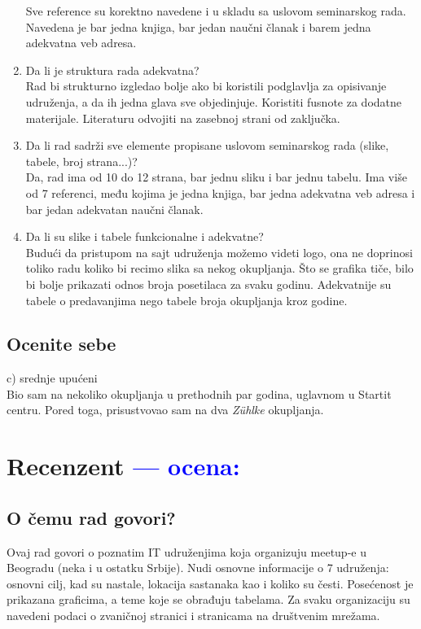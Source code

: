 \documentclass[a4paper]{report}
\newcommand{\odgovor}[1]{\textcolor{blue}{#1}}
\begin{document}
\begin{enumerate}
Sve reference su korektno navedene i u skladu sa uslovom seminarskog rada.
Navedena je bar jedna knjiga, bar jedan naučni članak i barem jedna adekvatna veb adresa.
\item Da li je struktura rada adekvatna?\\
Rad bi strukturno izgledao bolje ako bi koristili podglavlja za opisivanje udruženja,
a da ih jedna glava sve objedinjuje. Koristiti fusnote za dodatne materijale.
Literaturu odvojiti na zasebnoj strani od zaključka.
\item Da li rad sadrži sve elemente propisane uslovom seminarskog rada (slike, tabele, broj strana...)?\\
Da, rad ima od 10 do 12 strana, bar jednu sliku i bar jednu tabelu. Ima više od 7 referenci,
među kojima je jedna knjiga, bar jedna adekvatna veb adresa i bar jedan adekvatan naučni članak.
\item Da li su slike i tabele funkcionalne i adekvatne?\\
Budući da pristupom na sajt udruženja možemo videti logo, ona ne doprinosi toliko radu koliko bi recimo
slika sa nekog okupljanja. Što se grafika tiče, bilo bi bolje prikazati odnos broja posetilaca za svaku 
godinu. Adekvatnije su tabele o predavanjima nego tabele broja okupljanja kroz godine.
\end{enumerate}

\section{Ocenite sebe}
c) srednje upućeni\\
Bio sam na nekoliko okupljanja u prethodnih par godina, uglavnom
u Startit centru. Pored toga, prisustvovao sam na dva \textit{Zühlke} okupljanja. 


\chapter{Recenzent \odgovor{--- ocena:} }


\section{O čemu rad govori?}
Ovaj rad govori o poznatim IT udruženjima koja organizuju meetup-e u Beogradu (neka i u ostatku Srbije). Nudi osnovne informacije o 7 udruženja: osnovni cilj, kad su nastale, lokacija sastanaka kao i koliko su česti. Posećenost je prikazana graficima, a teme koje se obrađuju tabelama. Za svaku organizaciju su navedeni podaci o zvaničnoj stranici i stranicama na društvenim mrežama.
\end{document}
